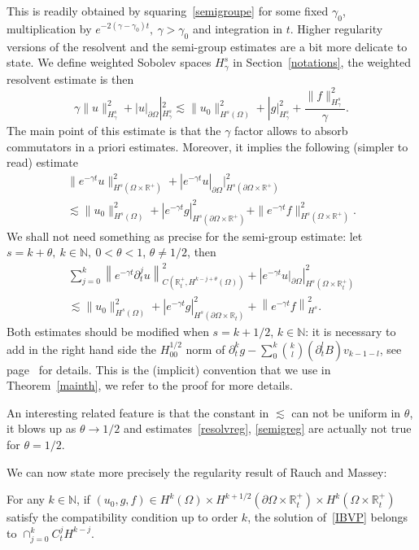 \documentclass[AHL,Unicode,longabstracts,published]{cedram}
\newcommand{\R}{\mathbb{R}}
\newcommand{\N}{\mathbb{N}}
\newcommand{\N}{\mathbb{N}}
\begin{document}
This is readily obtained by squaring~\eqref{semigroupe} for some fixed $\gamma_0$, multiplication by $e^{-2(\gamma -\gamma_0)t},\
\gamma >\gamma_0$ and integration in $t$. Higher regularity versions of the resolvent and the semi-group estimates are a bit more delicate to state. We define weighted Sobolev spaces $H^s_\gamma$ in Section~\ref{notations}, the weighted resolvent estimate is then
\begin{equation}\label{resolvreg}
\gamma \|u\|_{H^s_\gamma}^2 +|u|_{\partial\Omega}|_{H^s_\gamma}^2
\lesssim \|u_0\|_{H^s(\Omega)}^2+ |g|_{H^s_\gamma}^2+\frac{
\|f\|_{H^s_\gamma}^2}{\gamma}.
\end{equation}
The main point of this estimate is that the $\gamma$ factor allows to absorb commutators in a priori estimates. Moreover, it implies the following (simpler to read) estimate
\begin{multline}\label{resolvreguseless}
\|e^{-\gamma t}u\|_{H^s(\Omega\times \R^+)}^2 +|e^{-\gamma t}u|_{\partial\Omega}|_{H^s(\partial\Omega\times \R^+)}^2
\\
\lesssim \|u_0\|_{H^s(\Omega)}^2+ |e^{-\gamma t}g|_{H^s(\partial\Omega\times \R^+)}^2+
\|e^{-\gamma t}f\|_{H^s(\Omega\times \R^+)}^2.
\end{multline}
We shall not need something as precise for the semi-group estimate: let $s=k+\theta,\ k\in \N,\ 0<\theta<1$, $\theta\neq 1/2$, then
\begin{multline}\label{semigreg}
\sum_{j=0}^k\left\|e^{-\gamma t}\partial_t^ju\right\|_{C\left(\R_t^+,H^{k-j+\theta}(\Omega)\right)}^2 +\left|e^{-\gamma t}u|_{\partial\Omega}\right|_{H^s\left(\Omega\times \R_t^+\right)}^2
\\
\lesssim \|u_0\|_{H^s(\Omega)}^2+ |e^{-\gamma t}g|_{H^s\left(\partial\Omega\times \R_t\right)}^2+
\left\|e^{-\gamma t}f\right\|_{H^s}^2.
\end{multline}
Both estimates should be modified when $s=k+1/2$, $k\in\N$: it is necessary to add in the right hand side the $H^{1/2}_{00}$ norm of $\partial_t^kg-\sum_0^k
\binom{k}{l}(\partial_t^lB)v_{k-1-l}$, see page~\pageref{cas1/2} for details. This is the (implicit) convention that we use in Theorem~\ref{mainth}, we refer to the proof for more details.

An interesting related feature is that the constant in $\lesssim$ can not be uniform in $\theta$, it blows up as $\theta \to 1/2$ and estimates~\eqref{resolvreg}, \eqref{semigreg} are actually not true for $\theta=1/2$.


We can now state more precisely the regularity result of Rauch and Massey:
\begin{theo}
For any $k\in \N$, if $(u_0,g,f)\in H^k(\Omega)\times H^{k+1/2}(\partial \Omega\times \R_t^+)
\times H^k(\Omega\times \R_t^+)$ satisfy the compatibility condition up to order $k$, the solution of~\eqref{IBVP} belongs to $\cap_{j=0}^k C_t^jH^{k-j}$.
\end{theo}
\end{document}
